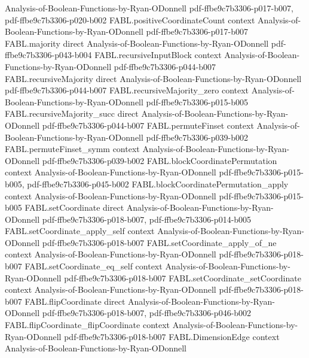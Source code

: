 \begin{theorem}
  {Analysis-of-Boolean-Functions-by-Ryan-ODonnell}
  {pdf-ffbe9c7b3306-p017-b007,
    pdf-ffbe9c7b3306-p020-b002}
\proofstep
  {FABL.positiveCoordinateCount}
  {context}
  {Analysis-of-Boolean-Functions-by-Ryan-ODonnell}
  {pdf-ffbe9c7b3306-p017-b007}
\proofstep
  {FABL.majority}
  {direct}
  {Analysis-of-Boolean-Functions-by-Ryan-ODonnell}
  {pdf-ffbe9c7b3306-p043-b004}
\proofstep
  {FABL.recursiveInputBlock}
  {context}
  {Analysis-of-Boolean-Functions-by-Ryan-ODonnell}
  {pdf-ffbe9c7b3306-p044-b007}
\proofstep
  {FABL.recursiveMajority}
  {direct}
  {Analysis-of-Boolean-Functions-by-Ryan-ODonnell}
  {pdf-ffbe9c7b3306-p044-b007}
\proofstep
  {FABL.recursiveMajority_zero}
  {context}
  {Analysis-of-Boolean-Functions-by-Ryan-ODonnell}
  {pdf-ffbe9c7b3306-p015-b005}
\proofstep
  {FABL.recursiveMajority_succ}
  {direct}
  {Analysis-of-Boolean-Functions-by-Ryan-ODonnell}
  {pdf-ffbe9c7b3306-p044-b007}
\proofstep
  {FABL.permuteFinset}
  {context}
  {Analysis-of-Boolean-Functions-by-Ryan-ODonnell}
  {pdf-ffbe9c7b3306-p039-b002}
\proofstep
  {FABL.permuteFinset_symm}
  {context}
  {Analysis-of-Boolean-Functions-by-Ryan-ODonnell}
  {pdf-ffbe9c7b3306-p039-b002}
\proofstep
  {FABL.blockCoordinatePermutation}
  {context}
  {Analysis-of-Boolean-Functions-by-Ryan-ODonnell}
  {pdf-ffbe9c7b3306-p015-b005,
    pdf-ffbe9c7b3306-p045-b002}
\proofstep
  {FABL.blockCoordinatePermutation_apply}
  {context}
  {Analysis-of-Boolean-Functions-by-Ryan-ODonnell}
  {pdf-ffbe9c7b3306-p015-b005}
\proofstep
  {FABL.setCoordinate}
  {direct}
  {Analysis-of-Boolean-Functions-by-Ryan-ODonnell}
  {pdf-ffbe9c7b3306-p018-b007,
    pdf-ffbe9c7b3306-p014-b005}
\proofstep
  {FABL.setCoordinate_apply_self}
  {context}
  {Analysis-of-Boolean-Functions-by-Ryan-ODonnell}
  {pdf-ffbe9c7b3306-p018-b007}
\proofstep
  {FABL.setCoordinate_apply_of_ne}
  {context}
  {Analysis-of-Boolean-Functions-by-Ryan-ODonnell}
  {pdf-ffbe9c7b3306-p018-b007}
\proofstep
  {FABL.setCoordinate_eq_self}
  {context}
  {Analysis-of-Boolean-Functions-by-Ryan-ODonnell}
  {pdf-ffbe9c7b3306-p018-b007}
\proofstep
  {FABL.setCoordinate_setCoordinate}
  {context}
  {Analysis-of-Boolean-Functions-by-Ryan-ODonnell}
  {pdf-ffbe9c7b3306-p018-b007}
\proofstep
  {FABL.flipCoordinate}
  {direct}
  {Analysis-of-Boolean-Functions-by-Ryan-ODonnell}
  {pdf-ffbe9c7b3306-p018-b007,
    pdf-ffbe9c7b3306-p046-b002}
\proofstep
  {FABL.flipCoordinate_flipCoordinate}
  {context}
  {Analysis-of-Boolean-Functions-by-Ryan-ODonnell}
  {pdf-ffbe9c7b3306-p018-b007}
\proofstep
  {FABL.DimensionEdge}
  {context}
  {Analysis-of-Boolean-Functions-by-Ryan-ODonnell}

\end{theorem}
